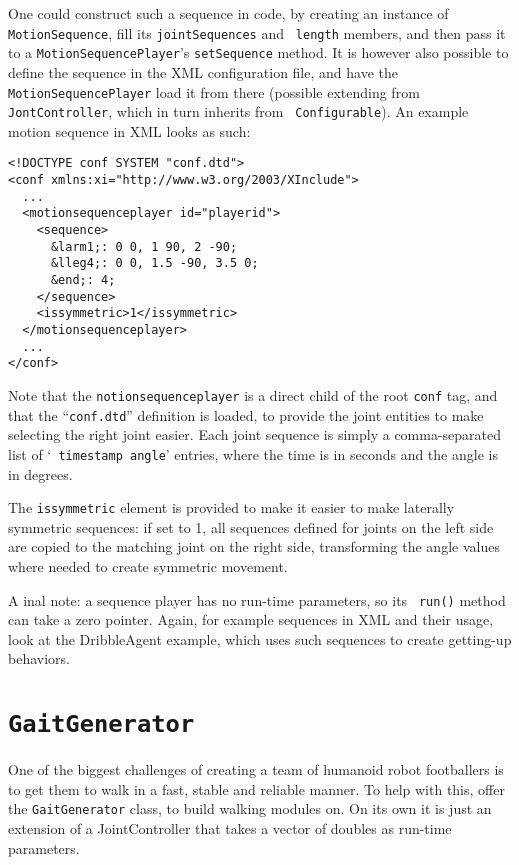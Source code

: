One could construct such a sequence in code, by creating an instance
of {\tt MotionSequence}, fill its {\tt jointSequences} and {\tt
  length} members, and then pass it to a {\tt MotionSequencePlayer}'s
{\tt setSequence} method. It is however also possible to define the
sequence in the XML configuration file, and have the {\tt
  MotionSequencePlayer} load it from there (possible extending from
{\tt JontController}, which in turn inherits from {\tt
  Configurable}). An example motion sequence in XML looks as such:
\begin{lstlisting}[frame=single]
<!DOCTYPE conf SYSTEM "conf.dtd">
<conf xmlns:xi="http://www.w3.org/2003/XInclude">  
  ...
  <motionsequenceplayer id="playerid">
    <sequence>
      &larm1;: 0 0, 1 90, 2 -90;
      &lleg4;: 0 0, 1.5 -90, 3.5 0;
      &end;: 4;
    </sequence>
    <issymmetric>1</issymmetric>
  </motionsequenceplayer>
  ...
</conf>
\end{lstlisting}
Note that the {\tt notionsequenceplayer} is a direct child of the root
{\tt conf} tag, and that the ``{\tt conf.dtd}'' definition is loaded,
to provide the joint entities to make selecting the right joint
easier. Each joint sequence is simply a comma-separated list of `{\tt
  timestamp angle}' entries, where the time is in seconds and the
angle is in degrees.

The {\tt issymmetric} element is provided to make it easier to make
laterally symmetric sequences: if set to 1, all sequences defined for
joints on the left side are copied to the matching joint on the right
side, transforming the angle values where needed to create symmetric
movement.

A inal note: a sequence player has no run-time parameters, so its {\tt
  run()} method can take a zero pointer. Again, for example sequences
in XML and their usage, look at the DribbleAgent example, which uses
such sequences to create getting-up behaviors.

\section{{\tt GaitGenerator}}
\label{sec:tt-gaitgenerator}

One of the biggest challenges of creating a team of humanoid robot
footballers is to get them to walk in a fast, stable and reliable
manner. To help with this, \libbats offer the {\tt GaitGenerator}
class, to build walking modules on. On its own it is just an extension
of a JointController that takes a vector of doubles as run-time
parameters.

